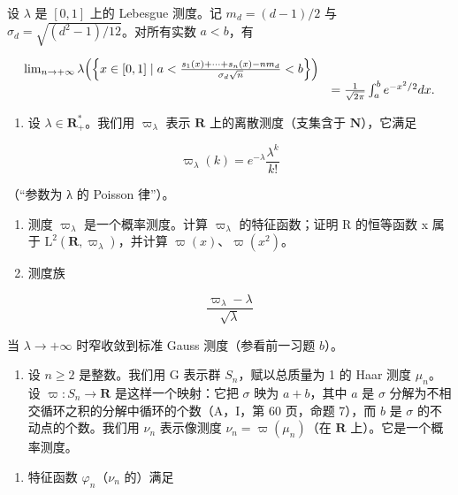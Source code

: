 设 \(\lambda\) 是 \([0,1]\) 上的 Lebesgue 测度。记 \(m_d = (d - 1)/2\) 与 \(\sigma_d = \sqrt{(d^2 - 1)/12}\)。对所有实数 \(a < b\)，有

\[
\begin{array}{r l} \lim _ {n \to + \infty} \lambda \Big (\Big \{x \in [ 0, 1 ] \mid a <   \frac {s _ {1} (x) + \cdots + s _ {n} (x) - n m _ {d}}{\sigma_ {d} \sqrt {n}} <   b \Big \} \Big) \\ & = \frac {1}{\sqrt {2 \pi}} \int_ {a} ^ {b} e ^ {- x ^ {2} / 2} d x. \end{array}
\]

\begin{enumerate}
\def\labelenumi{\arabic{enumi})}
\setcounter{enumi}{40}
\tightlist
\item
  设 \(\lambda \in \mathbf{R}_{+}^{*}\)。我们用 \(\varpi_{\lambda}\) 表示 \(\mathbf{R}\) 上的离散测度（支集含于 \(\mathbf{N}\)），它满足
\end{enumerate}

\[
\varpi_ {\lambda} (k) = e ^ {- \lambda} \frac {\lambda^ {k}}{k !}
\]

（“参数为 λ 的 Poisson 律”）。

\begin{enumerate}
\def\labelenumi{\alph{enumi})}
\item
  测度 \(\varpi_{\lambda}\) 是一个概率测度。计算 \(\varpi_{\lambda}\) 的特征函数；证明 R 的恒等函数 x 属于 \(\mathrm{L}^{2}(\mathbf{R},\varpi_{\lambda})\)，并计算 \(\varpi(x)\)、\(\varpi(x^{2})\)。
\item
  测度族
\end{enumerate}

\[
\frac {\varpi_ {\lambda} - \lambda}{\sqrt {\lambda}}
\]

当 \(\lambda\to+\infty\) 时窄收敛到标准 Gauss 测度（参看前一习题 \(b\)）。

\begin{enumerate}
\def\labelenumi{\arabic{enumi})}
\setcounter{enumi}{41}
\tightlist
\item
  设 \(n \geqslant 2\) 是整数。我们用 G 表示群 \(S_{n}\)，赋以总质量为 1 的 Haar 测度 \(\mu_{n}\)。设 \(\varpi: S_{n} \to \mathbf{R}\) 是这样一个映射：它把 \(\sigma\) 映为 \(a + b\)，其中 \(a\) 是 \(\sigma\) 分解为不相交循环之积的分解中循环的个数（A，I，第 60 页，命题 7），而 \(b\) 是 \(\sigma\) 的不动点的个数。我们用 \(\nu_{n}\) 表示像测度 \(\nu_{n} = \varpi(\mu_{n})\)（在 \(\mathbf{R}\) 上）。它是一个概率测度。
\end{enumerate}

\begin{enumerate}
\def\labelenumi{\alph{enumi})}
\tightlist
\item
  特征函数 \(\varphi_{n}\)（\(\nu_{n}\) 的）满足
\end{enumerate}

